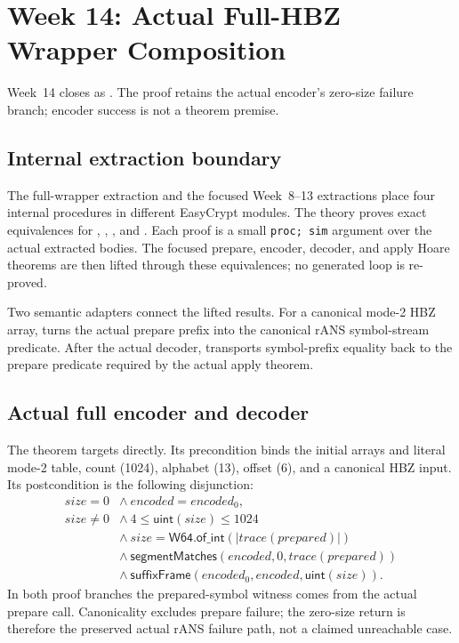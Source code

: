 \section{Week 14: Actual Full-HBZ Wrapper Composition}

Week~14 closes  as
.  The proof
retains the actual encoder's zero-size failure branch; encoder success is not
a theorem premise.

\subsection*{Internal extraction boundary}

The full-wrapper extraction and the focused Week~8--13 extractions place four
internal procedures in different EasyCrypt modules.  The theory
 proves exact equivalences for
, ,
, and .  Each proof is a
small \texttt{proc; sim} argument over the actual extracted bodies.  The
focused prepare, encoder, decoder, and apply Hoare theorems are then lifted
through these equivalences; no generated loop is re-proved.

Two semantic adapters connect the lifted results.  For a canonical mode-2 HBZ
array,  turns the actual
prepare prefix into the canonical rANS symbol-stream predicate.  After the
actual decoder,
 transports symbol-prefix
equality back to the prepare predicate required by the actual apply theorem.

\subsection*{Actual full encoder and decoder}

The theorem  targets
 directly.  Its precondition
binds the initial arrays and literal mode-2 table, count (1024), alphabet
(13), offset (6), and a canonical HBZ input.  Its postcondition is the
following disjunction:
\[
\begin{array}{ll}
size=0 &\land\ encoded=encoded_0,\\[1mm]
size\ne0 &\land\ 4\leq\mathsf{uint}(size)\leq1024\\
&\land\ size=\mathsf{W64.of\_int}(|trace(prepared)|)\\
&\land\ \mathsf{segmentMatches}(encoded,0,trace(prepared))\\
&\land\ \mathsf{suffixFrame}(encoded_0,encoded,\mathsf{uint}(size)).
\end{array}
\]
In both proof branches the prepared-symbol witness comes from the actual
prepare call.  Canonicality excludes prepare failure; the zero-size return is
therefore the preserved actual rANS failure path, not a claimed unreachable
case.

